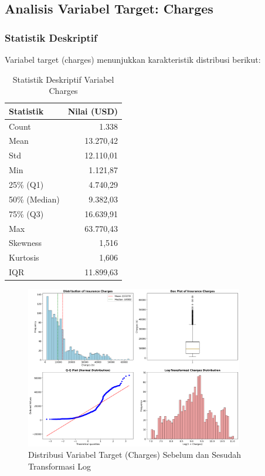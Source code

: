 \subsection{Analisis Variabel Target: Charges}
\label{subsec:analisis-target}

\subsubsection{Statistik Deskriptif}

Variabel target (charges) menunjukkan karakteristik distribusi berikut:

\begin{table}[H]
\centering
\caption{Statistik Deskriptif Variabel Charges}
\label{tab:charges-stats}
\begin{tabular}{|l|r|}
\hline
\textbf{Statistik} & \textbf{Nilai (USD)} \\
\hline
Count & 1.338 \\
Mean & 13.270,42 \\
Std & 12.110,01 \\
Min & 1.121,87 \\
25\% (Q1) & 4.740,29 \\
50\% (Median) & 9.382,03 \\
75\% (Q3) & 16.639,91 \\
Max & 63.770,43 \\
\hline
Skewness & 1,516 \\
Kurtosis & 1,606 \\
IQR & 11.899,63 \\
\hline
\end{tabular}
\end{table}

\begin{figure}[H]
\centering
\includegraphics[width=0.85\textwidth]{../results/plots/01_target_distribution.png}
\caption{Distribusi Variabel Target (Charges) Sebelum dan Sesudah Transformasi Log}
\label{fig:target-distribution}
\end{figure}

